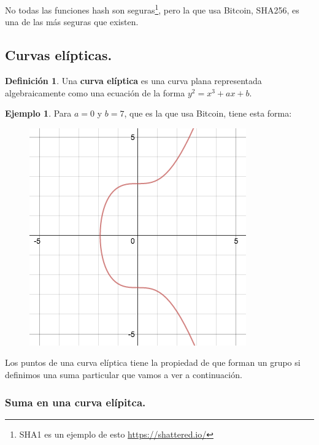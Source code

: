 \documentclass[twoside]{article}
\theoremstyle{definition}
\newtheorem{defi}[teorema]{Definición}
\newtheorem{ej}[teorema]{Ejemplo}
\begin{document}
No todas las funciones hash son seguras\footnote{SHA1 es un ejemplo de esto \url{https://shattered.io/}}, pero la que usa Bitcoin, SHA256, es una de las más seguras que existen.

\newpage

\subsection{Curvas elípticas.}
\begin{defi}
Una \textbf{curva elíptica} es una curva plana representada algebraicamente como una ecuación de la forma $y^2=x^3+ax+b$. 
\end{defi}

\begin{ej} Para $a=0$ y $b=7$, que es la que usa Bitcoin, tiene esta forma:
\begin{figure}[h!]
\includegraphics[scale=0.42]{ec}
\end{figure}
\end{ej}

Los puntos de una curva elíptica tiene la propiedad de que forman un grupo si definimos una suma particular que vamos a ver a continuación. 

\subsubsection{Suma en una curva elípitca.}
\end{document}

